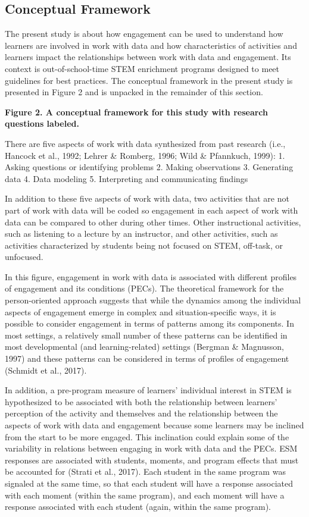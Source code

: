 \documentclass[]{msu-thesis}
\theoremstyle{definition}
\theoremstyle{definition}
\theoremstyle{definition}
\theoremstyle{remark}
\begin{document}
\subsection{Conceptual Framework}\label{conceptual-framework}

The present study is about how engagement can be used to understand how
learners are involved in work with data and how characteristics of
activities and learners impact the relationships between work with data
and engagement. Its context is out-of-school-time STEM enrichment
programs designed to meet guidelines for best practices. The conceptual
framework in the present study is presented in Figure 2 and is unpacked
in the remainder of this section.

\textbf{Figure 2. A conceptual framework for this study with research
questions labeled.}

There are five aspects of work with data synthesized from past research
(i.e., Hancock et al., 1992; Lehrer \& Romberg, 1996; Wild \& Pfannkuch,
1999): 1. Asking questions or identifying problems 2. Making
observations 3. Generating data 4. Data modeling 5. Interpreting and
communicating findings

In addition to these five aspects of work with data, two activities that
are not part of work with data will be coded so engagement in each
aspect of work with data can be compared to other during other times.
Other instructional activities, such as listening to a lecture by an
instructor, and other activities, such as activities characterized by
students being not focused on STEM, off-task, or unfocused.

In this figure, engagement in work with data is associated with
different profiles of engagement and its conditions (PECs). The
theoretical framework for the person-oriented approach suggests that
while the dynamics among the individual aspects of engagement emerge in
complex and situation-specific ways, it is possible to consider
engagement in terms of patterns among its components. In most settings,
a relatively small number of these patterns can be identified in most
developmental (and learning-related) settings (Bergman \& Magnusson,
1997) and these patterns can be considered in terms of profiles of
engagement (Schmidt et al., 2017).

In addition, a pre-program measure of learners' individual interest in
STEM is hypothesized to be associated with both the relationship between
learners' perception of the activity and themselves and the relationship
between the aspects of work with data and engagement because some
learners may be inclined from the start to be more engaged. This
inclination could explain some of the variability in relations between
engaging in work with data and the PECs. ESM responses are associated
with students, moments, and program effects that must be accounted for
(Strati et al., 2017). Each student in the same program was signaled at
the same time, so that each student will have a response associated with
each moment (within the same program), and each moment will have a
response associated with each student (again, within the same program).
\end{document}
